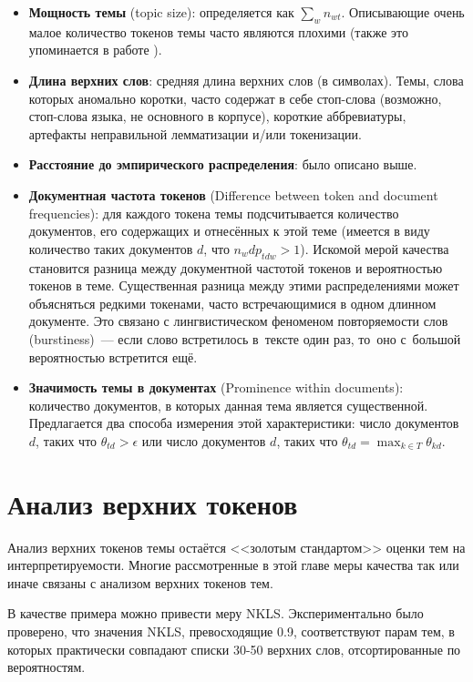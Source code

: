 \begin{itemize}
    \item \textbf{Мощность темы} (topic size): определяется как $\sum_w n_{wt}$. Описывающие очень малое количество токенов темы часто являются плохими (также это упоминается в работе \cite{mimno}).
    \item \textbf{Длина верхних слов}: средняя длина верхних слов (в символах). Темы, слова которых аномально коротки, часто содержат в себе стоп-слова (возможно, стоп-слова языка, не основного в корпусе), короткие аббревиатуры, артефакты неправильной лемматизации и/или токенизации.
    \item{\textbf{Расстояние до эмпирического распределения}: было описано выше.}
    \item{\textbf{Документная частота токенов} (Difference between token and document frequencies): для каждого токена темы подсчитывается количество документов, его содержащих и отнесённых к этой теме (имеется в виду количество таких документов $d$, что $n_wd p_{tdw} > 1$).
    Искомой мерой качества становится разница между документной частотой токенов и вероятностью токенов в теме. Существенная разница между этими распределениями может объясняться редкими токенами, часто встречающимися в одном длинном документе. Это связано с лингвистическом феноменом повторяемости слов (burstiness)~--- если слово встретилось в~тексте один раз, то~оно с~большой вероятностью встретится ещё.}
    \item{\textbf{Значимость темы в документах} (Prominence within documents): количество документов, в которых данная тема является существенной. Предлагается два способа измерения этой характеристики: число документов $d$, таких что $\theta_{td} > \epsilon$ или число документов $d$, таких что $\theta_{td} = \max_{k \in T} \theta_{kd}$.}
\end{itemize}

\section{Анализ верхних токенов}
\label{sec:toptokens}

Анализ верхних токенов темы остаётся <<золотым стандартом>> оценки тем на интерпретируемости. Многие рассмотренные в этой главе меры качества так или иначе связаны с анализом верхних токенов тем.

В качестве примера можно привести меру NKLS. Экспериментально было проверено, что значения NKLS, превосходящие 0.9, соответствуют парам тем, в которых практически совпадают списки 30-50 верхних слов, отсортированные по вероятностям.

